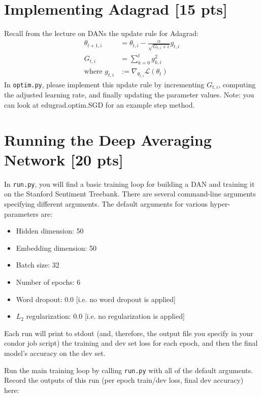 \documentclass[11pt]{article}
\begin{document}
\section{Implementing Adagrad [15 pts]}

Recall from the lecture on DANs the update rule for Adagrad:
\begin{align*}
  \theta_{t+1, i} &= \theta_{t, i} - \frac{\alpha}{\sqrt{G_{t, i} + \epsilon}} g_{t, i}
  \\
  G_{t, i} &= \sum_{k=0}^t g_{k, i}^2
  \\
  \text{where } g_{t, i} &:= \nabla_{\theta_{t,i}} \mathcal{L}(\theta_t)
\end{align*}
In \texttt{optim.py}, please implement this update rule by incrementing $G_{t, i}$, computing the adjusted learning rate, and finally updating the parameter values.  Note: you can look at edugrad.optim.SGD for an example step method.


\section{Running the Deep Averaging Network [20 pts]}

In \texttt{run.py}, you will find a basic training loop for building a DAN and training it on the Stanford Sentiment Treebank.  There are several command-line arguments specifying different arguments.  The default arguments for various hyper-parameters are:
\begin{itemize}
  \item Hidden dimension: 50
  \item Embedding dimension: 50
  \item Batch size: 32
  \item Number of epochs: 6
  \item Word dropout: 0.0 [i.e. no word dropout is applied]
  \item $L_2$ regularization: 0.0 [i.e. no regularization is applied]
\end{itemize}
Each run will print to stdout (and, therefore, the output file you specify in your condor job script) the training and dev set loss for each epoch, and then the final model's accuracy on the dev set.

\vspace{2em}
 Run the main training loop by calling \texttt{run.py} with all of the default arguments.  Record the outputs of this run (per epoch train/dev loss, final dev accuracy) here: 
\end{document}
